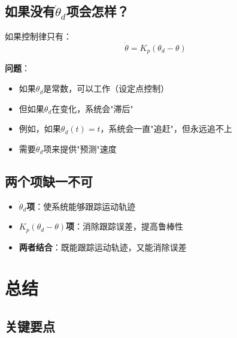 \documentclass[12pt,a4paper]{article}
\begin{document}
\subsection{如果没有$\dot{\theta}_d$项会怎样？}

如果控制律只有：
\begin{equation}
\dot{\theta} = K_p(\theta_d - \theta)
\end{equation}

\textbf{问题}：
\begin{itemize}
\item 如果$\theta_d$是常数，可以工作（设定点控制）
\item 但如果$\theta_d$在变化，系统会"滞后"
\item 例如，如果$\theta_d(t) = t$，系统会一直"追赶"，但永远追不上
\item 需要$\dot{\theta}_d$项来提供"预测"速度
\end{itemize}

\subsection{两个项缺一不可}

\begin{itemize}
\item \textbf{$\dot{\theta}_d$项}：使系统能够跟踪运动轨迹
\item \textbf{$K_p(\theta_d - \theta)$项}：消除跟踪误差，提高鲁棒性
\item \textbf{两者结合}：既能跟踪运动轨迹，又能消除误差
\end{itemize}

\section{总结}

\subsection{关键要点}
\end{document}
